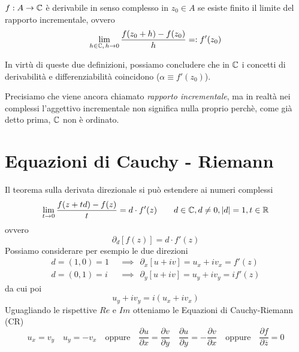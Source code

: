 \begin{defn}
$f:A\to\mathbb{C}$ è derivabile in senso complesso in $z_0\in A$ se esiste finito il limite del rapporto incrementale, ovvero
\begin{equation*}
\lim_{h\in\mathbb{C},\,h\rightarrow 0}\frac{f(z_0 + h) - f(z_0)}{h}=:f'(z_0)
\end{equation*}
\end{defn}

\begin{rem}
In virtù di queste due definizioni, possiamo concludere che in $\mathbb{C}$ i concetti di derivabilità e differenziabilità coincidono ($\alpha\equiv f'(z_0)$).
\end{rem}

Precisiamo che viene ancora chiamato \textit{rapporto incrementale}, ma in realtà nei complessi l'aggettivo incrementale non significa nulla proprio perchè, come già detto prima, $\mathbb{C}$ non è ordinato.

\section{Equazioni di Cauchy - Riemann}

Il teorema sulla derivata direzionale si può estendere ai numeri complessi
\begin{equation*}
\lim_{t\rightarrow 0}\frac{f(z + td) - f(z)}{t} = d \cdot  f'(z) \qquad d\in\mathbb{C}, d\neq0, |d| = 1, t\in \mathbb{R}
\end{equation*}
ovvero
\begin{equation*}
\partial_{d}[f(z)] = d \cdot f'(z)
\end{equation*}
Possiamo considerare per esempio le due direzioni
\begin{align*}
d = (1, 0) = 1 & \ \ \implies \ \ \partial_{x}[u + iv] = u_{x} + iv_{x} = f'(z)\\
d = (0, 1) = i & \ \ \implies \ \ \partial_{y}[u + iv] = u_{y} + iv_{y} = if'(z)
\end{align*}
da cui poi
\begin{equation*}
u_{y} + iv_{y} = i(u_{x} + iv_{x})
\end{equation*}
Uguagliando le rispettive $Re$ e $Im$ otteniamo le Equazioni di Cauchy-Riemann (CR)
\begin{equation*}
\boxed{u_{x} = v_{y}} \quad \boxed{u_{y} = - v_{x}} \quad\text{oppure}\quad \boxed{\frac{\partial u}{\partial x}=\frac{\partial v}{\partial y}} \quad \boxed{\frac{\partial u}{\partial y}=-\frac{\partial v}{\partial x}} \quad\text{oppure}\quad \boxed{\frac{\partial f}{\partial \overline{z}}=0}
\end{equation*}

